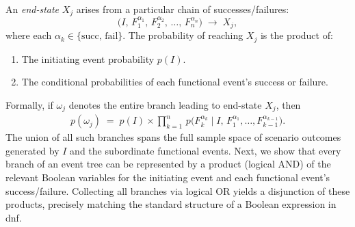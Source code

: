 An \emph{end-state} \(X_j\) arises from a particular chain of successes/failures:
\[
    \bigl(I,\,F_1^{\alpha_1},\,F_2^{\alpha_2},\,\ldots,\,F_n^{\alpha_n}\bigr)
    \;\longrightarrow\; 
    X_j,
\]
where each \(\alpha_k \in \{\text{succ},\,\text{fail}\}\). The probability of reaching \(X_j\) is the product of:
\begin{enumerate}
    \item The initiating event probability \(p(I)\).
    \item The conditional probabilities of each functional event's success or failure.
\end{enumerate}
Formally, if \(\omega_j\) denotes the entire branch leading to end-state \(X_j\), then
\begin{align}
\label{eq:event_tree_branch_probability}
    p(\omega_j)
    \;=\;
    p(I)
    \times
    \prod_{k=1}^{n}\,
    p\!\bigl(F_k^{\alpha_k}\mid 
             I,\,
             F_1^{\alpha_1},\ldots,
             F_{k-1}^{\alpha_{k-1}}\bigr).
\end{align}
The union of all such branches spans the full sample space of scenario outcomes generated by \(I\) and the subordinate functional events. Next, we show that every branch of an event tree can be represented by a product (logical AND) of the relevant Boolean variables for the initiating event and each functional event’s success/failure.  Collecting all branches via logical OR yields a disjunction of these products, precisely matching the standard structure of a Boolean expression in \acrfull{dnf}.